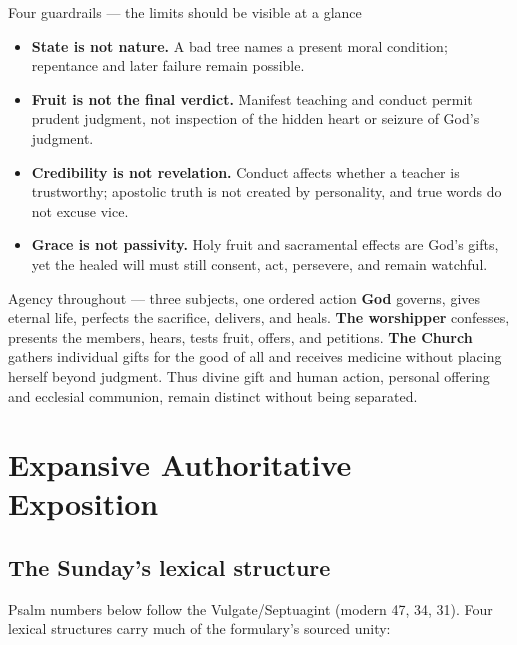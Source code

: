 \begin{deepstudy}
\begin{studybox}{Four guardrails --- the limits should be visible at a glance}
\begin{itemize}[topsep=0pt,itemsep=0.25em,parsep=0pt]
\item \textbf{State is not nature.} A bad tree names a present moral condition; repentance and later failure remain possible.
\item \textbf{Fruit is not the final verdict.} Manifest teaching and conduct permit prudent judgment, not inspection of the hidden heart or seizure of God's judgment.
\item \textbf{Credibility is not revelation.} Conduct affects whether a teacher is trustworthy; apostolic truth is not created by personality, and true words do not excuse vice.
\item \textbf{Grace is not passivity.} Holy fruit and sacramental effects are God's gifts, yet the healed will must still consent, act, persevere, and remain watchful.
\end{itemize}
\end{studybox}

\begin{massbox}{Agency throughout --- three subjects, one ordered action}
\textbf{God} governs, gives eternal life, perfects the sacrifice, delivers, and heals. \textbf{The worshipper} confesses, presents the members, hears, tests fruit, offers, and petitions. \textbf{The Church} gathers individual gifts for the good of all and receives medicine without placing herself beyond judgment. Thus divine gift and human action, personal offering and ecclesial communion, remain distinct without being separated.
\end{massbox}

\newpage
\section*{Expansive Authoritative Exposition}

\subsection*{The Sunday's lexical structure\enspace{}}

Psalm numbers below follow the Vulgate/Septuagint (modern 47, 34, 31). Four lexical structures carry much of the formulary's sourced unity:


\end{deepstudy}
